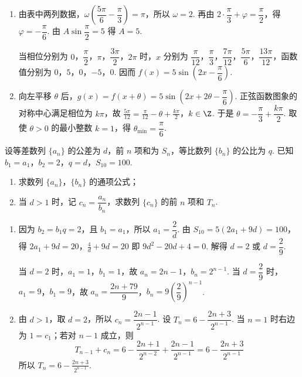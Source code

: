\begin{solution}
\begin{enumerate}
\item 由表中两列数据，\(\omega\left(\dfrac{5\pi}{6}-\dfrac{\pi}{3}\right)=\pi\)，所以 \(\omega=2\). 再由 \(2\cdot\dfrac{\pi}{3}+\varphi=\dfrac\pi2\)，得 \(\varphi=-\dfrac\pi6\). 由 \(A\sin\dfrac\pi2=5\) 得 \(A=5\).

当相位分别为 \(0\)，\(\dfrac\pi2\)，\(\pi\)，\(\dfrac{3\pi}{2}\)，\(2\pi\) 时，\(x\) 分别为
\(\dfrac\pi{12}\)，\(\dfrac\pi3\)，\(\dfrac{7\pi}{12}\)，\(\dfrac{5\pi}{6}\)，\(\dfrac{13\pi}{12}\)，函数值分别为 \(0\)，\(5\)，\(0\)，\(-5\)，\(0\). 因而
\(f(x)=5\sin\left(2x-\dfrac\pi6\right)\).

\item 向左平移 \(\theta\) 后，\(g(x)=f(x+\theta)=5\sin\left(2x+2\theta-\dfrac\pi6\right)\). 正弦函数图象的对称中心满足相位为 \(k\pi\)，故
\(\frac{5\pi}{12}=\frac\pi{12}-\theta+\frac{k\pi}{2}\)，\(k\in\Z\).
于是 \(\theta=-\dfrac\pi3+\dfrac{k\pi}{2}\). 取使 \(\theta>0\) 的最小整数 \(k=1\)，得 \(\theta_{\min}=\dfrac\pi6\).
\end{enumerate}
\end{solution}

\begin{problem}
设等差数列 \(\{a_n\}\) 的公差为 \(d\)，前 \(n\) 项和为 \(S_n\)，等比数列 \(\{b_n\}\) 的公比为 \(q\). 已知 \(b_1=a_1\)，\(b_2=2\)，\(q=d\)，\(S_{10}=100\).

\begin{enumerate}
\item 求数列 \(\{a_n\}\)，\(\{b_n\}\) 的通项公式；
\item 当 \(d>1\) 时，记 \(c_n=\dfrac{a_n}{b_n}\)，求数列 \(\{c_n\}\) 的前 \(n\) 项和 \(T_n\).
\end{enumerate}
\end{problem}

\begin{solution}
\begin{enumerate}
\item 因为 \(b_2=b_1q=2\)，且 \(b_1=a_1\)，所以 \(a_1=\dfrac2d\). 由 \(S_{10}=5(2a_1+9d)=100\)，得
\(2a_1+9d=20\)，\(\frac4d+9d=20\)
即 \(9d^2-20d+4=0\). 解得 \(d=2\) 或 \(d=\dfrac29\).

当 \(d=2\) 时，\(a_1=1\)，\(b_1=1\)，故 \(a_n=2n-1\)，\(b_n=2^{n-1}\). 当 \(d=\dfrac29\) 时，\(a_1=9\)，\(b_1=9\)，故 \(a_n=\dfrac{2n+79}{9}\)，\(b_n=9\left(\dfrac29\right)^{n-1}\).

\item 由 \(d>1\)，取 \(d=2\)，所以 \(c_n=\dfrac{2n-1}{2^{n-1}}\). 设
\(T_n=6-\dfrac{2n+3}{2^{n-1}}\). 当 \(n=1\) 时右边为 \(1=c_1\)；若对 \(n-1\) 成立，则
\[
T_{n-1}+c_n=6-\frac{2n+1}{2^{n-2}}+\frac{2n-1}{2^{n-1}}
=6-\frac{2n+3}{2^{n-1}}
\]
所以 \(\displaystyle T_n=6-\frac{2n+3}{2^{n-1}}\).
\end{enumerate}
\end{solution}

